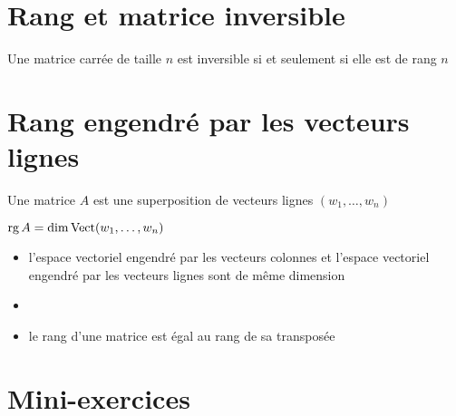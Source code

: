 \section{Rang et matrice inversible}

\begin{frame}

\begin{theoreme}
Une matrice carrée de taille $n$ est inversible si et seulement si elle
est de rang $n$
\end{theoreme}

\end{frame}

\section{Rang engendré par les vecteurs lignes}

\begin{frame}

Une matrice  $A$ est une superposition de vecteurs lignes $(w_1,\ldots,w_n)$

\pause

\begin{proposition}
$\mathop{\text{rg}}\nolimits A = \dim \mathop{\text{Vect}}\nolimits (w_1,\ldots,w_n)$
\end{proposition}

\pause

\begin{itemize}
  \item l'espace vectoriel engendré par les vecteurs colonnes
et l'espace vectoriel engendré par les vecteurs lignes sont de même dimension
 
\pause

  \item {}
  
\pause
  
  \item le rang d'une matrice est égal au rang de sa transposée
\end{itemize}

\end{frame}


\section{Mini-exercices}

